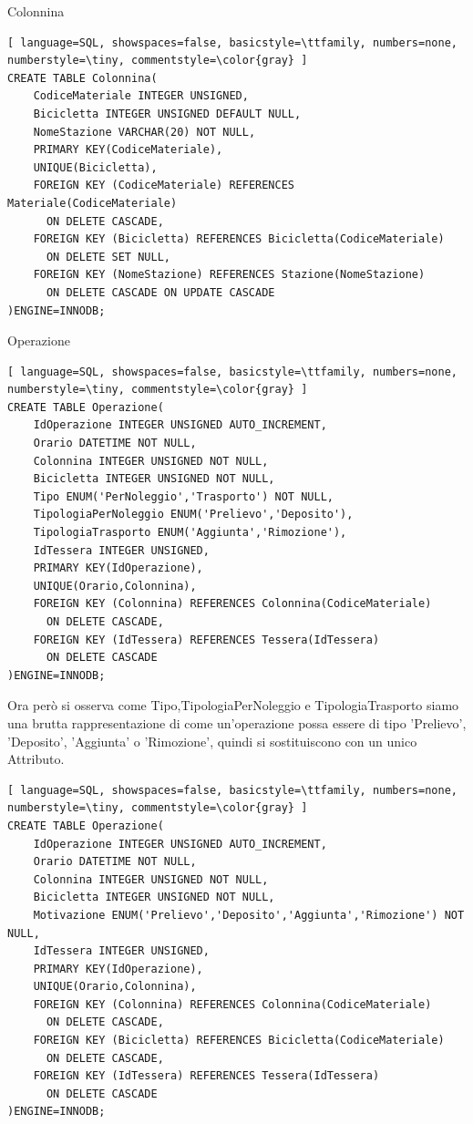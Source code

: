 \documentclass[a4paper,twoside]{article}
\begin{document}
Colonnina
\begin{lstlisting}[ language=SQL, showspaces=false, basicstyle=\ttfamily, numbers=none, numberstyle=\tiny, commentstyle=\color{gray} ]
CREATE TABLE Colonnina(
	CodiceMateriale INTEGER UNSIGNED,
	Bicicletta INTEGER UNSIGNED DEFAULT NULL,
	NomeStazione VARCHAR(20) NOT NULL,
	PRIMARY KEY(CodiceMateriale),
	UNIQUE(Bicicletta),
	FOREIGN KEY (CodiceMateriale) REFERENCES Materiale(CodiceMateriale)
	  ON DELETE CASCADE,
	FOREIGN KEY (Bicicletta) REFERENCES Bicicletta(CodiceMateriale)
	  ON DELETE SET NULL,
	FOREIGN KEY (NomeStazione) REFERENCES Stazione(NomeStazione)
	  ON DELETE CASCADE ON UPDATE CASCADE
)ENGINE=INNODB;
\end{lstlisting}
Operazione
\begin{lstlisting}[ language=SQL, showspaces=false, basicstyle=\ttfamily, numbers=none, numberstyle=\tiny, commentstyle=\color{gray} ]
CREATE TABLE Operazione(
	IdOperazione INTEGER UNSIGNED AUTO_INCREMENT,
	Orario DATETIME NOT NULL,
	Colonnina INTEGER UNSIGNED NOT NULL,
	Bicicletta INTEGER UNSIGNED NOT NULL,
	Tipo ENUM('PerNoleggio','Trasporto') NOT NULL,
	TipologiaPerNoleggio ENUM('Prelievo','Deposito'),
	TipologiaTrasporto ENUM('Aggiunta','Rimozione'),
	IdTessera INTEGER UNSIGNED,
	PRIMARY KEY(IdOperazione),
	UNIQUE(Orario,Colonnina),
	FOREIGN KEY (Colonnina) REFERENCES Colonnina(CodiceMateriale)
	  ON DELETE CASCADE,
	FOREIGN KEY (IdTessera) REFERENCES Tessera(IdTessera)
	  ON DELETE CASCADE
)ENGINE=INNODB;
\end{lstlisting}
Ora però si osserva come Tipo,TipologiaPerNoleggio e TipologiaTrasporto siamo una brutta rappresentazione di come un'operazione possa essere di tipo 'Prelievo', 'Deposito', 'Aggiunta' o 'Rimozione', quindi si sostituiscono con un unico Attributo.
\begin{lstlisting}[ language=SQL, showspaces=false, basicstyle=\ttfamily, numbers=none, numberstyle=\tiny, commentstyle=\color{gray} ]
CREATE TABLE Operazione(
	IdOperazione INTEGER UNSIGNED AUTO_INCREMENT,
	Orario DATETIME NOT NULL,
	Colonnina INTEGER UNSIGNED NOT NULL,
	Bicicletta INTEGER UNSIGNED NOT NULL,
	Motivazione ENUM('Prelievo','Deposito','Aggiunta','Rimozione') NOT NULL,
	IdTessera INTEGER UNSIGNED,
	PRIMARY KEY(IdOperazione),
	UNIQUE(Orario,Colonnina),
	FOREIGN KEY (Colonnina) REFERENCES Colonnina(CodiceMateriale)
	  ON DELETE CASCADE,
	FOREIGN KEY (Bicicletta) REFERENCES Bicicletta(CodiceMateriale)
	  ON DELETE CASCADE,
	FOREIGN KEY (IdTessera) REFERENCES Tessera(IdTessera)
	  ON DELETE CASCADE
)ENGINE=INNODB;
\end{lstlisting}
\end{document}
